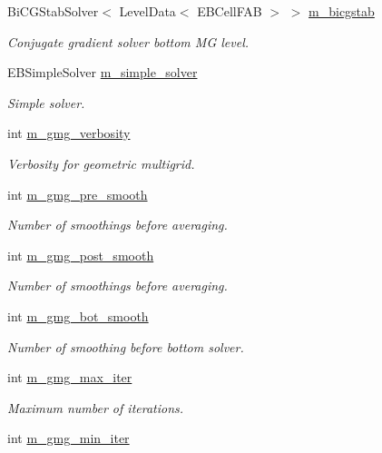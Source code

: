 \begin{DoxyCompactItemize}
Bi\+C\+G\+Stab\+Solver$<$ Level\+Data$<$ E\+B\+Cell\+F\+AB $>$ $>$ \hyperlink{classcdr__tga_ac602ec9e346a1443966b1182174c6818}{m\+\_\+bicgstab}
\begin{DoxyCompactList}\small\item\em Conjugate gradient solver bottom MG level. \end{DoxyCompactList}\item 
E\+B\+Simple\+Solver \hyperlink{classcdr__tga_abab5acb873ba297c1c7d13c0542e4f1d}{m\+\_\+simple\+\_\+solver}
\begin{DoxyCompactList}\small\item\em Simple solver. \end{DoxyCompactList}\item 
int \hyperlink{classcdr__tga_a42454cdf64ab18cd6df2c8ce97a361d8}{m\+\_\+gmg\+\_\+verbosity}
\begin{DoxyCompactList}\small\item\em Verbosity for geometric multigrid. \end{DoxyCompactList}\item 
int \hyperlink{classcdr__tga_add66cfe62e2963f1c03a07fb1ade22f9}{m\+\_\+gmg\+\_\+pre\+\_\+smooth}
\begin{DoxyCompactList}\small\item\em Number of smoothings before averaging. \end{DoxyCompactList}\item 
int \hyperlink{classcdr__tga_aa7ce3d85b26d268c0346309ec8beb3fc}{m\+\_\+gmg\+\_\+post\+\_\+smooth}
\begin{DoxyCompactList}\small\item\em Number of smoothings before averaging. \end{DoxyCompactList}\item 
int \hyperlink{classcdr__tga_a87b2508abfb3b2a694401556220bd5ca}{m\+\_\+gmg\+\_\+bot\+\_\+smooth}
\begin{DoxyCompactList}\small\item\em Number of smoothing before bottom solver. \end{DoxyCompactList}\item 
int \hyperlink{classcdr__tga_a70596e82d7ac32db288490d679dbee23}{m\+\_\+gmg\+\_\+max\+\_\+iter}
\begin{DoxyCompactList}\small\item\em Maximum number of iterations. \end{DoxyCompactList}\item 
int \hyperlink{classcdr__tga_aa069980aa70a020f7fda891045b2b15e}{m\+\_\+gmg\+\_\+min\+\_\+iter}

\end{DoxyCompactItemize}
